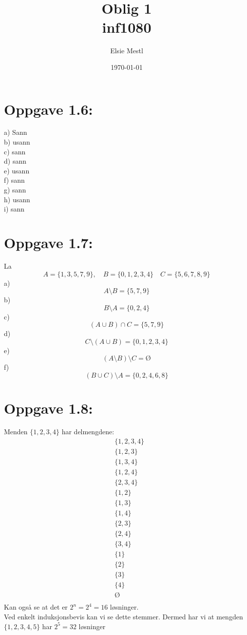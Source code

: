 \documentclass[a4paper, norsk, 10pt]{article}
\date{\today}
\title{Oblig 1 \\ inf1080}
\author{Elsie Mestl}
\begin{document}
\maketitle
\begin{flushleft}
\section*{Oppgave 1.6:}

a) Sann\\
b) usann\\
c) sann\\
d) sann\\
e) usann\\
f) sann\\
g) sann\\
h) usann\\
i) sann\\


\section*{Oppgave 1.7:}
La \[A = \{1,3,5,7,9\}, \quad B = \{0, 1,2,3,4\} \quad C = \{5,6,7,8,9\}\]
a) \[A\setminus B = \{5,7,9\}\]
b) \[B \setminus A = \{0,2,4\}\]
c) \[(A\cup B) \cap C = \{5,7,9\}\]
d) \[C \setminus (A \cup B) = \{0,1,2,3,4\}\]
e) \[(A\setminus B)\setminus C = Ø\]
f) \[(B \cup C) \setminus A = \{0,2,4,6,8\}\]

\section*{Oppgave 1.8:}
Menden \(\{1,2,3,4\}\) har delmengdene:
\[\begin{split}
  &\{1,2,3,4\}\\
&\{1,2,3\}\\
&\{1,3,4\}\\
&\{1,2,4\}\\
&\{2,3,4\}\\
&\{1,2\}\\
&\{1,3\}\\
&\{1,4\}\\
&\{2,3\}\\
&\{2,4\}\\
&\{3,4\}\\
&\{1\}\\
&\{2\}\\
&\{3\}\\
&\{4\}\\
&Ø\\
\end{split}\]
Kan også se at det er \(2^{n} = 2^{4} = 16\) løsninger. \\Ved enkelt induksjonsbevis kan vi se dette stemmer. Dermed har vi at mengden \(\{1,2,3,4,5\}\) har \( 2^{5} = 32 \) løsninger
\end{flushleft}
\end{document}
